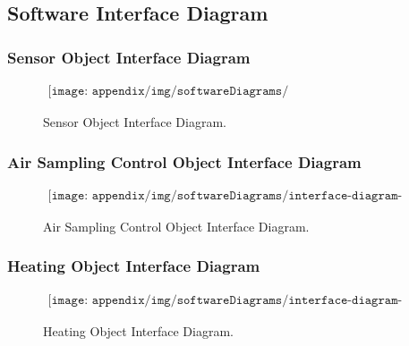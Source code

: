 \subsection{Software Interface Diagram} \label{sec:appC}
\subsubsection{Sensor Object Interface Diagram} %
\begin{figure}[H]
    \begin{align*}
       \texttt{[image: appendix/img/softwareDiagrams/interface\_diagram-1-2.jpg]}
    \end{align*}
    \caption{Sensor Object Interface Diagram.}
    \label{fig:C1}
\end{figure}


\subsubsection{Air Sampling Control Object Interface Diagram} %
\begin{figure}[H]
    \begin{align*}
        \texttt{[image: appendix/img/softwareDiagrams/interface-diagram-AC-1-2.jpg]}
    \end{align*}
    \caption{Air Sampling Control Object Interface Diagram.}
    \label{fig:C2}
\end{figure}


\subsubsection{Heating Object Interface Diagram} %
\begin{figure}[H]
    \begin{align*}
        \texttt{[image: appendix/img/softwareDiagrams/interface-diagram-Heating-1-3.jpg]}
    \end{align*}
    \caption{Heating Object Interface Diagram.}
    \label{fig:C3}
\end{figure}